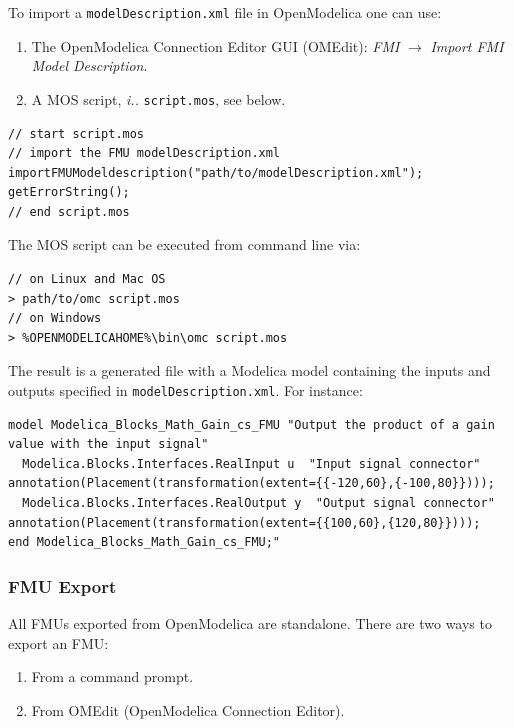 To import a \texttt{modelDescription\allowbreak{}.xml} file in OpenModelica one can use:
\begin{enumerate}
\item The OpenModelica Connection Editor GUI (OMEdit): \emph{FMI} $\rightarrow$ \emph{Import FMI Model Description}.
\item A MOS script, \emph{i.\@e.\@} \texttt{script.mos}, see below.
\end{enumerate}
%
%
%
\begin{lstlisting}[language=modelica]
// start script.mos
// import the FMU modelDescription.xml
importFMUModeldescription("path/to/modelDescription.xml"); getErrorString();
// end script.mos
\end{lstlisting}
%
%
The MOS script can be executed from command line via:
\begin{lstlisting}
// on Linux and Mac OS
> path/to/omc script.mos
// on Windows
> %OPENMODELICAHOME%\bin\omc script.mos
\end{lstlisting}

%
The result is a generated file with a Modelica model containing the inputs and outputs specified in \texttt{modelDescription\allowbreak{}.xml}.  For instance:
%
%
%
\begin{lstlisting}[language=modelica]
model Modelica_Blocks_Math_Gain_cs_FMU "Output the product of a gain value with the input signal"
  Modelica.Blocks.Interfaces.RealInput u  "Input signal connector" annotation(Placement(transformation(extent={{-120,60},{-100,80}})));
  Modelica.Blocks.Interfaces.RealOutput y  "Output signal connector" annotation(Placement(transformation(extent={{100,60},{120,80}})));
end Modelica_Blocks_Math_Gain_cs_FMU;"
\end{lstlisting}
%
%
%
%
%
%
\subsubsection{FMU Export}
All FMUs exported from OpenModelica are standalone. There are two ways to export an FMU:
%
%
%
\begin{enumerate}
\item From a command prompt.
\item From OMEdit (OpenModelica Connection Editor).
\end{enumerate}
%
%
%
